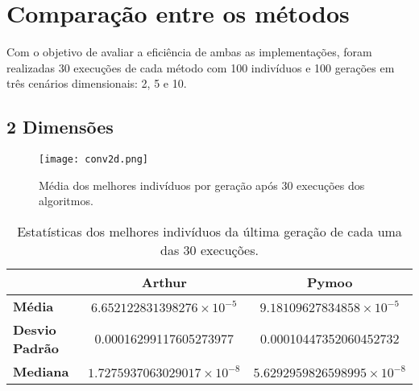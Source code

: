 \documentclass{article}
\begin{document}
\section{Comparação entre os métodos}

Com o objetivo de avaliar a eficiência de ambas as implementações, foram realizadas 30 execuções de cada método com 100 indivíduos e 100 gerações em três cenários dimensionais: 2, 5 e 10. 


\subsection{2 Dimensões}

\begin{figure}[htbp]
  \centering
  \texttt{[image: conv2d.png]}
  \caption{Média dos melhores indivíduos por geração após 30 execuções dos algoritmos.}
\end{figure}

\begin{table}[htbp]
    \centering
    \begin{tabular}{|l|c|c|}
    \hline
    \textbf{} & \textbf{Arthur} & \textbf{Pymoo} \\
    \hline
    \textbf{Média} & $6.652122831398276 \times 10^{-5}$ & $9.18109627834858\times 10^{-5}$ \\
    \hline
    \textbf{Desvio Padrão} & 0.00016299117605273977 & 0.00010447352060452732 \\
    \hline
    \textbf{Mediana} & $1.7275937063029017\times 10^{-8}$ & $5.6292959826598995\times 10^{-8}$ \\
    \hline
    \end{tabular}
    \caption{Estatísticas dos melhores indivíduos da última geração de cada uma das 30 execuções.}
\end{table}

\newpage

\end{document}
